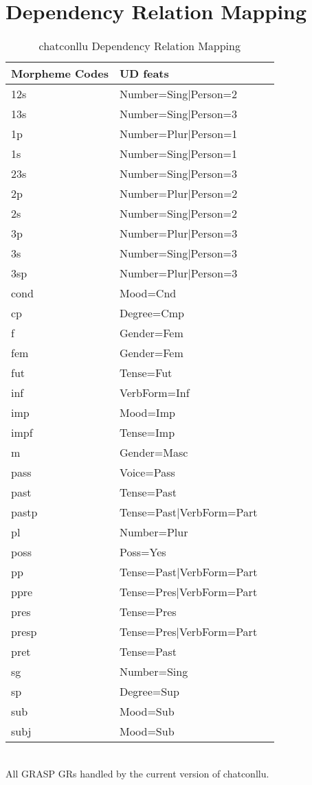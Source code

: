 \newpage
\section{Dependency Relation Mapping}
\begin{table}[h!]
\caption {chatconllu Dependency Relation Mapping} \label{tab:grmap}
\centering
\begin{tabularx}{\linewidth}{@{}lXl@{}}
\toprule
\textbf{Morpheme Codes} & \textbf{UD feats}\\ \midrule
    12s & Number=Sing|Person=2\\
    13s & Number=Sing|Person=3\\
    1p & Number=Plur|Person=1\\
    1s & Number=Sing|Person=1\\
    23s & Number=Sing|Person=3\\
    2p & Number=Plur|Person=2\\
    2s & Number=Sing|Person=2\\
    3p & Number=Plur|Person=3\\
    3s & Number=Sing|Person=3\\
    3sp & Number=Plur|Person=3\\
    cond & Mood=Cnd\\
    cp & Degree=Cmp\\
    f & Gender=Fem\\
    fem & Gender=Fem\\
    fut & Tense=Fut\\
    inf & VerbForm=Inf\\
    imp & Mood=Imp\\
    impf & Tense=Imp\\
    m & Gender=Masc\\
    pass & Voice=Pass\\
    past & Tense=Past\\
    pastp & Tense=Past|VerbForm=Part\\
    pl & Number=Plur\\
    poss & Poss=Yes\\
    pp & Tense=Past|VerbForm=Part\\
    ppre & Tense=Pres|VerbForm=Part\\
    pres & Tense=Pres\\
    presp & Tense=Pres|VerbForm=Part\\
    pret & Tense=Past\\
    sg & Number=Sing\\
    sp & Degree=Sup\\
    sub & Mood=Sub\\
    subj & Mood=Sub\\\bottomrule
\end{tabularx}\\
\vspace{0.5cm}
All GRASP GRs handled by the current version of chatconllu.\\
\end{table}
